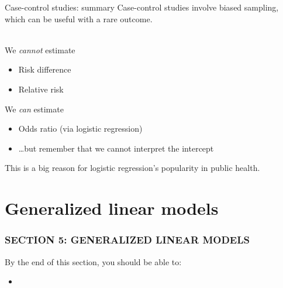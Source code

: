 \documentclass[10pt,t]{beamer}
\newcommand\tab[1][1cm]{\hspace*{#1}}
\begin{document}
\begin{frame}{Case-control studies: summary}
	Case-control studies involve biased sampling, which can be useful with a rare outcome. 
	\\ ~\ 
	
	We \textit{cannot} estimate
	\begin{itemize}
		\item Risk difference 
		\item Relative risk
	\end{itemize}
	\vspace{0.2cm}
	We \textit{can} estimate
	\begin{itemize}
		\item Odds ratio (via logistic regression)
		\item[] \tab \dots but remember that we cannot interpret the intercept
	\end{itemize}
	\vspace{0.2cm}
	This is a big reason for logistic regression's popularity in public health.  
\end{frame}

\section{Generalized linear models}
\begin{frame}
	\frametitle{SECTION 5: GENERALIZED LINEAR MODELS}
	By the end of this section, you should be able to:
	\begin{itemize}
		\item 
	\end{itemize}
\end{frame}
\end{document}
